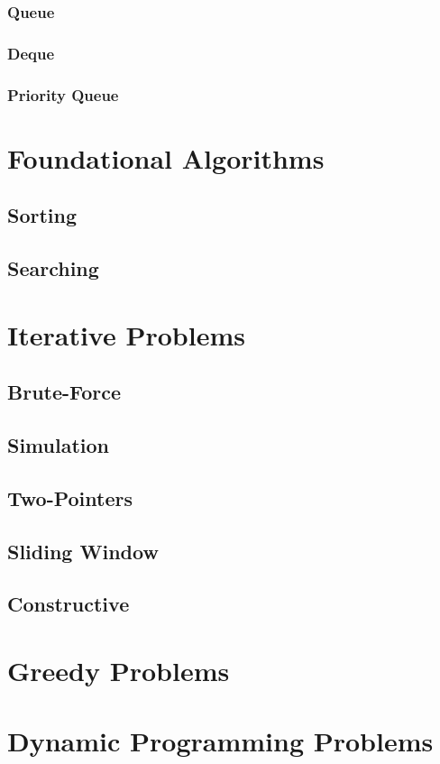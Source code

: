 \documentclass[12pt]{article}
\begin{document}
\subsubsection{Queue}
\subsubsection{Deque}
\subsubsection{Priority Queue}

\section{Foundational Algorithms}
\subsection{Sorting}
\subsection{Searching}

\section{Iterative Problems}
\subsection{Brute-Force}
\subsection{Simulation}
\subsection{Two-Pointers}
\subsection{Sliding Window}
\subsection{Constructive}

\section{Greedy Problems}

\section{Dynamic Programming Problems}
\end{document}
